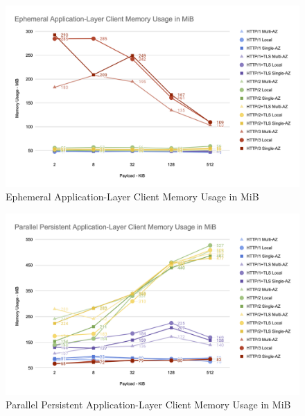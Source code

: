 \begin{figure}[h!]
    \centering
    \includegraphics[width=\linewidth]{figures/charts/Ephemeral Application-Layer Client Memory Usage in MiB.png}
    \caption{Ephemeral Application-Layer Client Memory Usage in MiB}
    \label{fig:ephemeral_client_app_memory}
\end{figure}

\begin{figure}[h!]
    \centering
    \includegraphics[width=\linewidth]{figures/charts/Parallel Persistent Application-Layer Client Memory Usage in MiB.png}
    \caption{Parallel Persistent Application-Layer Client Memory Usage in MiB}
    \label{fig:parallel_client_app_memory}
\end{figure}

